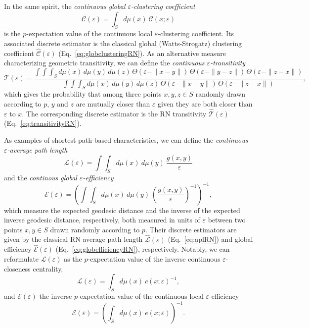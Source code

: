 In the same spirit, the \emph{continuous global $\varepsilon$-clustering coefficient}
\begin{equation}
\mathcal{C}(\varepsilon)=\int_S d\mu(x)\ \mathcal{C}(x;\varepsilon)
\end{equation}
\noindent
is the $p$-expectation value of the continuous local $\varepsilon$-clustering coefficient. Its associated discrete estimator is the classical global (Watts-Strogatz) clustering coefficient $\hat{\mathcal{C}}(\varepsilon)$ (Eq.~\ref{eq:globclusteringRN}). As an alternative measure characterizing geometric transitivity, we can define the \emph{continuous $\varepsilon$-transitivity}
\begin{equation}
\mathcal{T}(\varepsilon)=\frac{\int\int\int_S d\mu(x)\, d\mu(y)\, d\mu(z)\, \Theta(\varepsilon-\|x-y\|)\, \Theta(\varepsilon-\|y-z\|)\, \Theta(\varepsilon-\|z-x\|)}{\int\int\int_S d\mu(x)\, d\mu(y)\, d\mu(z)\, \Theta(\varepsilon-\|x-y\|)\, \Theta(\varepsilon-\|z-x\|)},
\end{equation}
\noindent
which gives the probability that among three points $x,y,z\in S$ randomly drawn according to $p$, $y$ and $z$ are mutually closer than $\varepsilon$ given they are both closer than $\varepsilon$ to $x$. The corresponding discrete estimator is the RN transitivity $\hat{\mathcal{T}}(\varepsilon)$ (Eq.~\ref{eq:transitivityRN}).

As examples of shortest path-based characteristics, we can define the \emph{continuous $\varepsilon$-average path length}
\begin{equation}
\mathcal{L}(\varepsilon)=\int\int_S d\mu(x)\ d\mu(y)\ \frac{g(x,y)}{\varepsilon}
\end{equation}
\noindent
and the \emph{continous global $\varepsilon$-efficiency}
\begin{equation}
\mathcal{E}(\varepsilon)=\left(\int\int_S d\mu(x)\ d\mu(y)\ \left(\frac{g(x,y)}{\varepsilon}\right)^{-1}\right)^{-1},
\end{equation}
\noindent
which measure the expected geodesic distance and the inverse of the expected inverse geodesic distance, respectively, both measured in units of $\varepsilon$ between two points $x,y\in S$ drawn randomly according to $p$. Their discrete estimators are given by the classical RN average path length $\hat{\mathcal{L}}(\varepsilon)$ (Eq.~\ref{eq:aplRN}) and global efficiency $\hat{\mathcal{E}}(\varepsilon)$ (Eq.~\ref{eq:globefficiencyRN}), respectively. Notably, we can reformulate $\mathcal{L}(\varepsilon)$ as the $p$-expectation value of the inverse continuous $\varepsilon$-closeness centrality,
\begin{equation}
\mathcal{L}(\varepsilon)=\int_S d\mu(x)\ c(x;\varepsilon)^{-1},
\end{equation}
\noindent
and $\mathcal{E}(\varepsilon)$ the inverse $p$-expectation value of the continuous local $\varepsilon$-efficiency
\begin{equation}
\mathcal{E}(\varepsilon)=\left(\int_S d\mu(x)\ e(x;\varepsilon)\right)^{-1}.
\end{equation}


